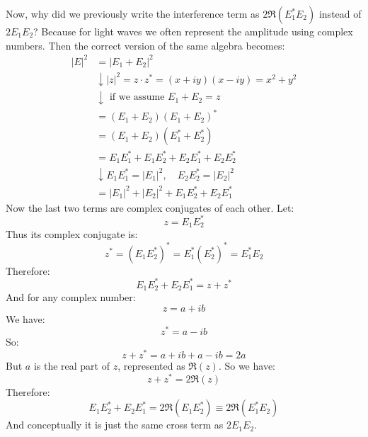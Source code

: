 \begin{deepeningbox}
    \highspace
    \textcolor{Green3}{} Now, why did we previously write the interference term as $2\Re\left(E_1^* E_2\right)$ instead of $2 E_1 E_2$? Because for light waves we often represent the amplitude using complex numbers. Then the correct version of the same algebra becomes:
    \begin{equation*}
        \begin{aligned}
            \left|E\right|^{2} &= \left|E_1 + E_2\right|^{2} \\[.3em]
            &\downarrow \left|z\right|^{2} = z \cdot z^* = \left(x + iy\right)\left(x - iy\right) = x^2 + y^2 \\[.3em]
            &\downarrow \text{ if we assume } E_1 + E_2 = z \\[.3em]
            &= \left(E_1 + E_2\right)\left(E_1 + E_2\right)^* \\[.3em]
            &= \left(E_1 + E_2\right)\left(E_1^* + E_2^*\right) \\[.3em]
            &= E_1 E_1^* + E_1 E_2^* + E_2 E_1^* + E_2 E_2^* \\[.3em]
            &\downarrow E_1 E_1^* = \left|E_1\right|^{2}, \quad E_2 E_2^* = \left|E_2\right|^{2} \\[.3em]
            &= \left|E_1\right|^{2} + \left|E_2\right|^{2} + E_1 E_2^* + E_2 E_1^*
        \end{aligned}
    \end{equation*}
    Now the last two terms are complex conjugates of each other. Let:
    \begin{equation*}
        z = E_1 E_2^*
    \end{equation*}
    Thus its complex conjugate is:
    \begin{equation*}
        z^* = \left(E_1 E_2^*\right)^* = E_1^* \left(E_2^*\right)^* = E_1^* E_2
    \end{equation*}
    Therefore:
    \begin{equation*}
        E_1 E_2^* + E_2 E_1^* = z + z^*
    \end{equation*}
    And for any complex number:
    \begin{equation*}
        z = a + ib
    \end{equation*}
    We have:
    \begin{equation*}
        z^* = a - ib
    \end{equation*}
    So:
    \begin{equation*}
        z + z^* = a + ib + a - ib = 2a
    \end{equation*}
    But $a$ is the real part of $z$, represented as $\Re(z)$. So we have:
    \begin{equation*}
        z + z^* = 2\Re(z)
    \end{equation*}
    Therefore:
    \begin{equation*}
        E_1 E_2^* + E_2 E_1^* = 2\Re\left(E_1 E_2^*\right) \equiv 2\Re\left(E_1^* E_2\right)
    \end{equation*}
    And conceptually it is just the same cross term as $2 E_1 E_2$.
\end{deepeningbox}

